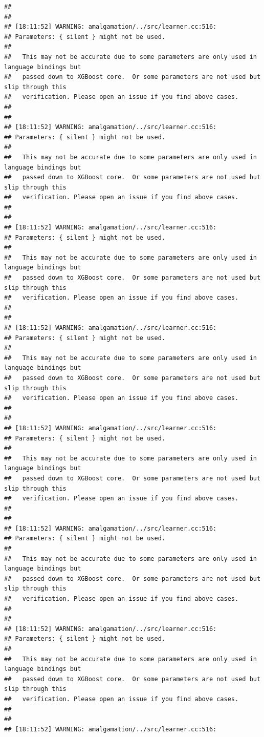 \documentclass[AMS,STIX2COL]{WileyNJD-v2}\usepackage[]{graphicx}\usepackage[]{color}
\makeatletter
\newenvironment{kframe}{%
 \def\at@end@of@kframe{}%
 \ifinner\ifhmode%
  \def\at@end@of@kframe{\end{minipage}}%
  \begin{minipage}{\columnwidth}%
 \fi\fi%
 \def\FrameCommand##1{\hskip\@totalleftmargin \hskip-\fboxsep
 \colorbox{shadecolor}{##1}\hskip-\fboxsep
     \hskip-\linewidth \hskip-\@totalleftmargin \hskip\columnwidth}%
 \MakeFramed {\advance\hsize-\width
   \@totalleftmargin\z@ \linewidth\hsize
   \@setminipage}}%
 {\par\unskip\endMakeFramed%
 \at@end@of@kframe}
\newenvironment{knitrout}{}{} %
\makeatother
\begin{document}
\begin{knitrout}
\begin{kframe}
\begin{verbatim}
## 
## 
## [18:11:52] WARNING: amalgamation/../src/learner.cc:516: 
## Parameters: { silent } might not be used.
## 
##   This may not be accurate due to some parameters are only used in language bindings but
##   passed down to XGBoost core.  Or some parameters are not used but slip through this
##   verification. Please open an issue if you find above cases.
## 
## 
## [18:11:52] WARNING: amalgamation/../src/learner.cc:516: 
## Parameters: { silent } might not be used.
## 
##   This may not be accurate due to some parameters are only used in language bindings but
##   passed down to XGBoost core.  Or some parameters are not used but slip through this
##   verification. Please open an issue if you find above cases.
## 
## 
## [18:11:52] WARNING: amalgamation/../src/learner.cc:516: 
## Parameters: { silent } might not be used.
## 
##   This may not be accurate due to some parameters are only used in language bindings but
##   passed down to XGBoost core.  Or some parameters are not used but slip through this
##   verification. Please open an issue if you find above cases.
## 
## 
## [18:11:52] WARNING: amalgamation/../src/learner.cc:516: 
## Parameters: { silent } might not be used.
## 
##   This may not be accurate due to some parameters are only used in language bindings but
##   passed down to XGBoost core.  Or some parameters are not used but slip through this
##   verification. Please open an issue if you find above cases.
## 
## 
## [18:11:52] WARNING: amalgamation/../src/learner.cc:516: 
## Parameters: { silent } might not be used.
## 
##   This may not be accurate due to some parameters are only used in language bindings but
##   passed down to XGBoost core.  Or some parameters are not used but slip through this
##   verification. Please open an issue if you find above cases.
## 
## 
## [18:11:52] WARNING: amalgamation/../src/learner.cc:516: 
## Parameters: { silent } might not be used.
## 
##   This may not be accurate due to some parameters are only used in language bindings but
##   passed down to XGBoost core.  Or some parameters are not used but slip through this
##   verification. Please open an issue if you find above cases.
## 
## 
## [18:11:52] WARNING: amalgamation/../src/learner.cc:516: 
## Parameters: { silent } might not be used.
## 
##   This may not be accurate due to some parameters are only used in language bindings but
##   passed down to XGBoost core.  Or some parameters are not used but slip through this
##   verification. Please open an issue if you find above cases.
## 
## 
## [18:11:52] WARNING: amalgamation/../src/learner.cc:516: 

\end{verbatim}
\end{kframe}
\end{knitrout}
\end{document}
